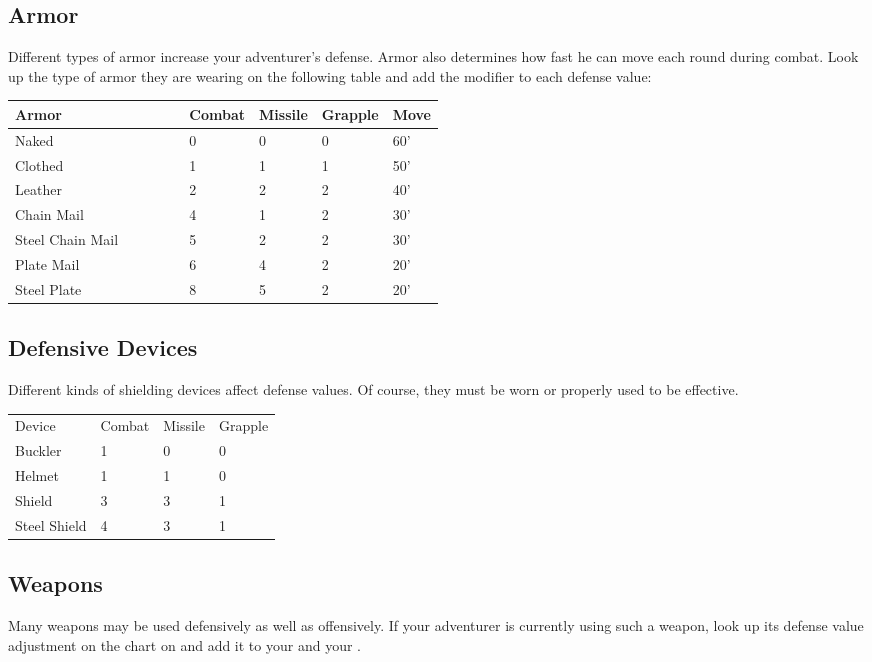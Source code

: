 \begin{multicols*}{2}
\subsection{Armor}
Different types of armor increase your adventurer's defense. Armor also determines how fast he can move each round during combat. Look up the type of armor they are wearing on the following table and add the modifier to each defense value:
\begin{normbox}
\begin{tabular}{@{}l p{0.125\linewidth} p{0.125\linewidth} p{0.125\linewidth} p{0.125\linewidth}}
\small
\textbf{Armor} & \textbf{Combat} & \textbf{Missile} & \textbf{Grapple} & \textbf{Move}\\
\midrule
Naked & 0 & 0 & 0 & 60'\\
Clothed & 1 & 1 & 1 & 50'\\
Leather & 2 & 2 & 2 & 40'\\
Chain Mail & 4 & 1 & 2 & 30'\\
Steel Chain Mail  & 5 & 2 & 2 & 30'\\
Plate Mail & 6 & 4 & 2 & 20'\\
Steel Plate & 8 & 5 & 2 & 20'\\
\end{tabular}
\end{normbox}
\subsection{Defensive Devices}
Different kinds of shielding devices affect defense values. Of course, they must be worn or properly used to be effective.
\begin{normbox}
\begin{tabular}{l l l l}
Device & Combat & Missile & Grapple\\
Buckler & 1 & 0 & 0\\
Helmet & 1 & 1 & 0\\
Shield & 3 & 3 & 1\\
Steel Shield & 4 & 3 & 1\\
\end{tabular}
\end{normbox}
\subsection{Weapons}
Many weapons may be used defensively as well as offensively. If your adventurer is currently using such a weapon, look up its defense value adjustment on the  chart on \tcpage{\pageref{playing-weapon-table}} and add it to your \CDV and your \GDV.
\end{multicols*}